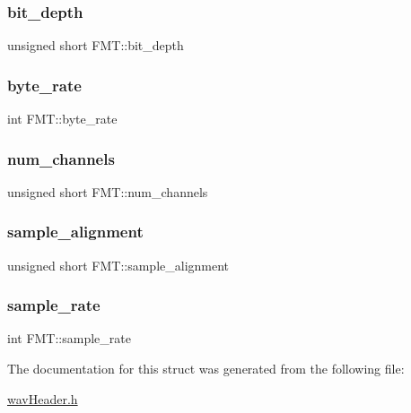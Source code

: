 \mbox{\label{structFMT_a79e51e1ecd1fbb1de975ea73d07e3193}} 
\subsubsection{\texorpdfstring{bit\+\_\+depth}{bit\_depth}}
{\footnotesize\ttfamily unsigned short F\+M\+T\+::bit\+\_\+depth}

\mbox{\label{structFMT_ada872d0d97744d55e35530140ac22003}} 
\subsubsection{\texorpdfstring{byte\+\_\+rate}{byte\_rate}}
{\footnotesize\ttfamily int F\+M\+T\+::byte\+\_\+rate}

\mbox{\label{structFMT_a28919c7db5b63cb70af4dc7f8405599e}} 
\subsubsection{\texorpdfstring{num\+\_\+channels}{num\_channels}}
{\footnotesize\ttfamily unsigned short F\+M\+T\+::num\+\_\+channels}

\mbox{\label{structFMT_a59c3f8f2f14ff86b8d10cfbf822f71e9}} 
\subsubsection{\texorpdfstring{sample\+\_\+alignment}{sample\_alignment}}
{\footnotesize\ttfamily unsigned short F\+M\+T\+::sample\+\_\+alignment}

\mbox{\label{structFMT_ad09f55ae3078ca9c3545204c4b241910}} 
\subsubsection{\texorpdfstring{sample\+\_\+rate}{sample\_rate}}
{\footnotesize\ttfamily int F\+M\+T\+::sample\+\_\+rate}



The documentation for this struct was generated from the following file\+:\begin{DoxyCompactItemize}
\item 
\hyperlink{wavHeader_8h}{wav\+Header.\+h}\end{DoxyCompactItemize}
